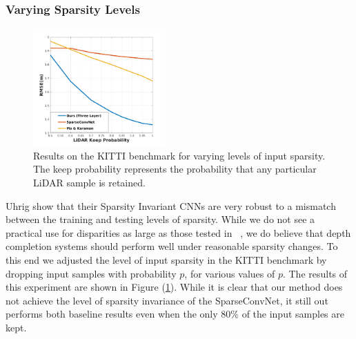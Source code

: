 \subsubsection{Varying Sparsity Levels}
\label{sec:vary-spars-levels}
\begin{figure}
  \centering
  \includegraphics[width=0.45\textwidth]{sparsity_plot}
  \caption{Results on the KITTI benchmark for varying levels of input sparsity. The keep probability represents the probability that any particular LiDAR sample is retained.}
  \label{fig:sparsity}
\end{figure}
Uhrig \etal show that their Sparsity Invariant CNNs are very robust to a mismatch between the training and testing levels of sparsity. While we do not see a practical use for disparities as large as those tested in ~\cite{uhrig}, we do believe that depth completion systems should perform well under reasonable sparsity changes. To this end we adjusted the level of input sparsity in the KITTI benchmark by dropping input samples with probability $p$, for various values of $p$. The results of this experiment are shown in Figure (\ref{fig:sparsity}). While it is clear that our method does not achieve the level of sparsity invariance of the SparseConvNet, it still out performs both baseline results even when the only 80\% of the input samples are kept.
